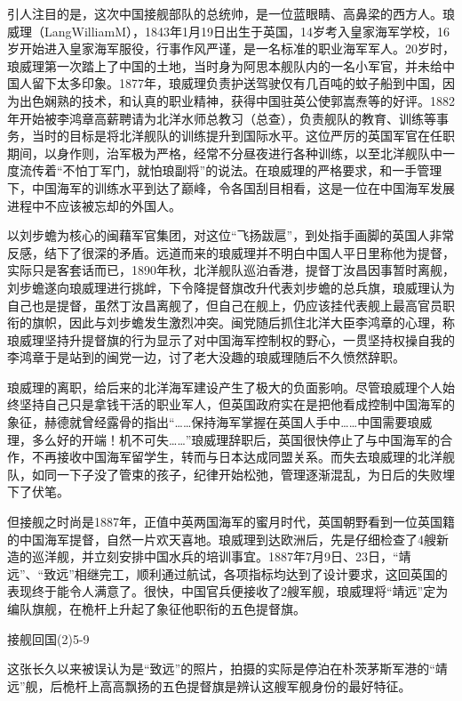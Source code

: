 \documentclass[12pt,UTF8]{ctexbook}
\begin{document}
引人注目的是，这次中国接舰部队的总统帅，是一位蓝眼睛、高鼻梁的西方人。琅威理（LangWilliamM），1843年1月19日出生于英国，14岁考入皇家海军学校，16岁开始进入皇家海军服役，行事作风严谨，是一名标准的职业海军军人。20岁时，琅威理第一次踏上了中国的土地，当时身为阿思本舰队内的一名小军官，并未给中国人留下太多印象。1877年，琅威理负责护送驾驶仅有几百吨的蚊子船到中国，因为出色娴熟的技术，和认真的职业精神，获得中国驻英公使郭嵩焘等的好评。1882年开始被李鸿章高薪聘请为北洋水师总教习（总查），负责舰队的教育、训练等事务，当时的目标是将北洋舰队的训练提升到国际水平。这位严厉的英国军官在任职期间，以身作则，治军极为严格，经常不分昼夜进行各种训练，以至北洋舰队中一度流传着“不怕丁军门，就怕琅副将”的说法。在琅威理的严格要求，和一手管理下，中国海军的训练水平到达了巅峰，令各国刮目相看，这是一位在中国海军发展进程中不应该被忘却的外国人。

以刘步蟾为核心的闽藉军官集团，对这位“飞扬跋扈”，到处指手画脚的英国人非常反感，结下了很深的矛盾。远道而来的琅威理并不明白中国人平日里称他为提督，实际只是客套话而已，1890年秋，北洋舰队巡泊香港，提督丁汝昌因事暂时离舰，刘步蟾遂向琅威理进行挑衅，下令降提督旗改升代表刘步蟾的总兵旗，琅威理认为自己也是提督，虽然丁汝昌离舰了，但自己在舰上，仍应该挂代表舰上最高官员职衔的旗帜，因此与刘步蟾发生激烈冲突。闽党随后抓住北洋大臣李鸿章的心理，称琅威理坚持升提督旗的行为显示了对中国海军控制权的野心，一贯坚持权操自我的李鸿章于是站到的闽党一边，讨了老大没趣的琅威理随后不久愤然辞职。

琅威理的离职，给后来的北洋海军建设产生了极大的负面影响。尽管琅威理个人始终坚持自己只是拿钱干活的职业军人，但英国政府实在是把他看成控制中国海军的象征，赫德就曾经露骨的指出“……保持海军掌握在英国人手中……中国需要琅威理，多么好的开端！机不可失……”琅威理辞职后，英国很快停止了与中国海军的合作，不再接收中国海军留学生，转而与日本达成同盟关系。而失去琅威理的北洋舰队，如同一下子没了管束的孩子，纪律开始松弛，管理逐渐混乱，为日后的失败埋下了伏笔。

但接舰之时尚是1887年，正值中英两国海军的蜜月时代，英国朝野看到一位英国籍的中国海军提督，自然一片欢天喜地。琅威理到达欧洲后，先是仔细检查了4艘新造的巡洋舰，并立刻安排中国水兵的培训事宜。1887年7月9日、23日，“靖远”、“致远”相继完工，顺利通过航试，各项指标均达到了设计要求，这回英国的表现终于能令人满意了。很快，中国官兵便接收了2艘军舰，琅威理将“靖远”定为编队旗舰，在桅杆上升起了象征他职衔的五色提督旗。

接舰回国(2)5-9

这张长久以来被误认为是“致远”的照片，拍摄的实际是停泊在朴茨茅斯军港的“靖远”舰，后桅杆上高高飘扬的五色提督旗是辨认这艘军舰身份的最好特征。
\end{document}
